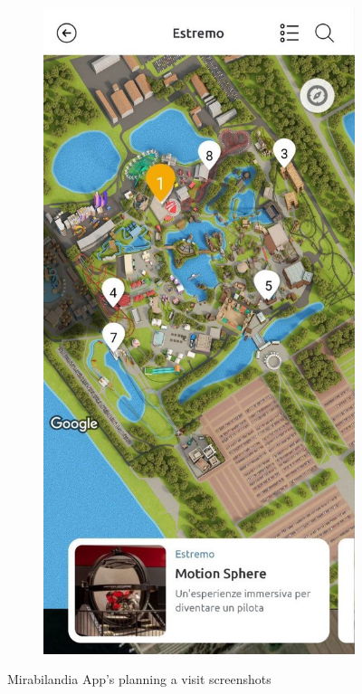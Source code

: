 \begin{figure}[H]
\begin{subfigure}[b]{0.35\textwidth}
    \end{subfigure}
    \begin{subfigure}[b]{0.35\textwidth}
        \centering
        \includegraphics[width=\textwidth]{img/miraextr}
    \end{subfigure}
    \caption{Mirabilandia App's planning a visit screenshots}
    \label{fig:miraApp}
\end{figure}